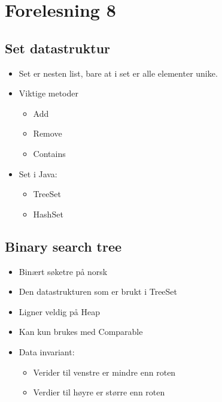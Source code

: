 \documentclass{article}
\begin{document}
    \section{Forelesning 8}

    \subsection{Set datastruktur}

    \begin{itemize}
        \item Set er nesten list, bare at i set er alle elementer unike.
        \item Viktige metoder
            \begin{itemize}
                \item Add
                \item Remove
                \item Contains
            \end{itemize}
        \item Set i Java:
            \begin{itemize}
                \item TreeSet
                \item HashSet
            \end{itemize}
    \end{itemize}



    \subsection{Binary search tree}

    \begin{itemize}
        \item Binært søketre på norsk
        \item Den datastrukturen som er brukt i TreeSet
        \item Ligner veldig på Heap
        \item Kan kun brukes med Comparable
        \item Data invariant:
        \begin{itemize}
        \item Verider til venstre er mindre enn roten
        \item Verdier til høyre er større enn roten
        \end{itemize}
    \end{itemize}
\end{document}
